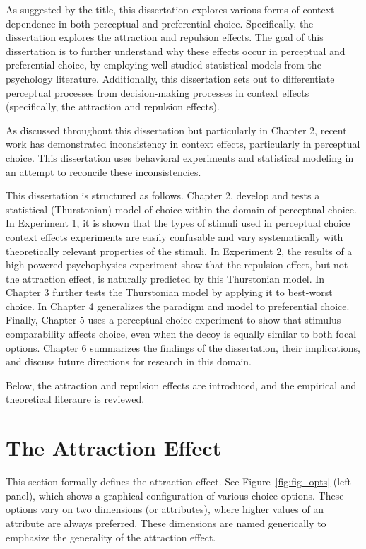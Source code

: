 As suggested by the title, this dissertation explores various forms of context dependence in both perceptual and preferential choice. Specifically, the dissertation explores the attraction and repulsion effects. The goal of this dissertation is to further understand why these effects occur in perceptual and preferential choice, by employing well-studied statistical models from the psychology literature. Additionally, this dissertation sets out to differentiate perceptual processes from decision-making processes in context effects (specifically, the attraction and repulsion effects).

As discussed throughout this dissertation but particularly in Chapter 2, recent work has demonstrated inconsistency in context effects, particularly in perceptual choice. This dissertation uses behavioral experiments and statistical modeling in an attempt to reconcile these inconsistencies.

This dissertation is structured as follows. Chapter 2, develop and tests a statistical (Thurstonian) model of choice within the domain of perceptual choice. In Experiment 1, it is shown that the types of stimuli used in perceptual choice context effects experiments are easily confusable and vary systematically with theoretically relevant properties of the stimuli. In Experiment 2, the results of a high-powered psychophysics experiment show that the repulsion effect, but not the attraction effect, is naturally predicted by this Thurstonian model. In Chapter 3 further tests the Thurstonian model by applying it to best-worst choice. In Chapter 4 generalizes the paradigm and model to preferential choice. Finally, Chapter 5 uses a perceptual choice experiment to show that stimulus comparability affects choice, even when the decoy is equally similar to both focal options. Chapter 6 summarizes the findings of the dissertation, their implications, and discuss future directions for research in this domain. 

Below, the attraction and repulsion effects are introduced, and the empirical and theoretical literaure is reviewed.

\section{The Attraction Effect}
This section formally defines the attraction effect. See Figure~\ref{fig:fig_opts} (left panel), which shows a graphical configuration of various choice options. These options vary on two dimensions (or attributes), where higher values of an attribute are always preferred. These dimensions are named generically to emphasize the generality of the attraction effect.

